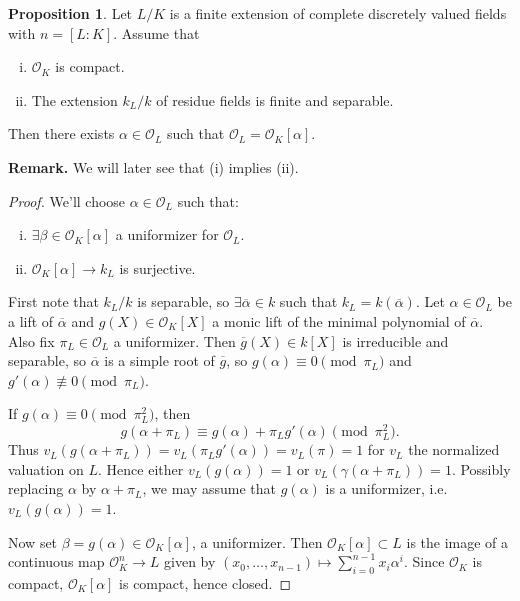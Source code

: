 \documentclass{article}
\theoremstyle{definition}
\newtheorem{prop}[theorem]{Proposition}
\begin{document}
\begin{prop}
    Let $L/K$ is a finite extension of complete discretely valued fields with $n = [L:K]$. Assume that
    \begin{enumerate}[(i)]
        \item $\mathcal{O}_K$ is compact.
        \item The extension $k_{L}/k$ of residue fields is finite and separable.
    \end{enumerate}
    Then there exists $\alpha \in \mathcal{O}_L$ such that $\mathcal{O}_L = \mathcal{O}_K[\alpha]$.
\end{prop}
\textbf{Remark.} We will later see that (i) implies (ii).
\begin{proof}
    We'll choose $\alpha \in \mathcal{O}_L$ such that:
    \begin{enumerate}[(i)]
        \item $\exists \beta \in \mathcal{O}_K[\alpha]$ a uniformizer for $\mathcal{O}_L$.
        \item $\mathcal{O}_K[\alpha] \to k_L$ is surjective.
    \end{enumerate}
    First note that $k_L/k$ is separable, so $\exists \overline{\alpha} \in k$ such that $k_L = k(\overline{\alpha})$. Let $\alpha \in \mathcal{O}_L$ be a lift of $\overline{\alpha}$ and $g(X) \in \mathcal{O}_K[X]$ a monic lift of the minimal polynomial of $\overline{\alpha}$. Also fix $\pi_L \in \mathcal{O}_L$ a uniformizer. Then $\overline{g}(X) \in k[X]$ is irreducible and separable, so $\overline{\alpha}$ is a simple root of $\overline{g}$, so $g(\alpha) \equiv 0 \pmod{\pi_L}$ and $g'(\alpha) \not\equiv 0 \pmod{\pi_L}$.
    \vspace{1mm}
     
    If $g(\alpha) \equiv  0 \pmod{\pi_L^2}$, then \[
    g(\alpha + \pi_L) \equiv  g(\alpha) + \pi_L g'(\alpha) \pmod{\pi_L^2}.
    \]
    Thus $v_L(g(\alpha+\pi_L)) = v_L(\pi_Lg'(\alpha)) = v_L(\pi) = 1$ for $v_L$ the normalized valuation on $L$. Hence either $v_L(g(\alpha))= 1$ or $v_L(\gamma(\alpha+\pi_L)) = 1$. Possibly replacing $\alpha$ by $\alpha + \pi_L$, we may assume that $g(\alpha)$ is a uniformizer, i.e. $v_L(g(\alpha)) = 1$.
    \vspace{1mm}
     
    Now set $\beta = g(\alpha) \in \mathcal{O}_K[\alpha]$, a uniformizer. Then $\mathcal{O}_K[\alpha] \subset L$ is the image of a continuous map $\mathcal{O}_K^n \to L$ given by $(x_0,\ldots,x_{n-1}) \mapsto \sum_{i=0}^{n-1} x_i \alpha^i$. Since $\mathcal{O}_K$ is compact, $\mathcal{O}_K[\alpha]$ is compact, hence closed.
    \vspace{1mm}
     

\end{proof}
\end{document}
